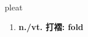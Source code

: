 
\begin{frame}
{\huge pleat}
\begin{center}
\begin{enumerate}\Large
  \item \textbf{n./vt. 打褶: fold}
\end{enumerate}
\end{center}
\end{frame}
